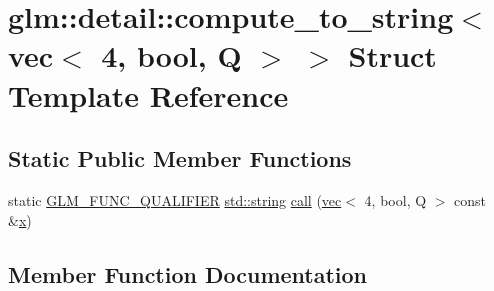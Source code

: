 \hypertarget{structglm_1_1detail_1_1compute__to__string_3_01vec_3_014_00_01bool_00_01_q_01_4_01_4}{}\section{glm\+:\+:detail\+:\+:compute\+\_\+to\+\_\+string$<$ vec$<$ 4, bool, Q $>$ $>$ Struct Template Reference}
\label{structglm_1_1detail_1_1compute__to__string_3_01vec_3_014_00_01bool_00_01_q_01_4_01_4}
\subsection*{Static Public Member Functions}
\begin{DoxyCompactItemize}
\item 
static \mbox{\hyperlink{setup_8hpp_a33fdea6f91c5f834105f7415e2a64407}{G\+L\+M\+\_\+\+F\+U\+N\+C\+\_\+\+Q\+U\+A\+L\+I\+F\+I\+ER}} \mbox{\hyperlink{_s_d_l__opengl__glext_8h_ae84541b4f3d8e1ea24ec0f466a8c568b}{std\+::string}} \mbox{\hyperlink{structglm_1_1detail_1_1compute__to__string_3_01vec_3_014_00_01bool_00_01_q_01_4_01_4_acc9ef66b31a0aaa989ee98614e340e27}{call}} (\mbox{\hyperlink{structglm_1_1vec}{vec}}$<$ 4, bool, Q $>$ const \&\mbox{\hyperlink{_s_d_l__opengl_8h_ad0e63d0edcdbd3d79554076bf309fd47}{x}})
\end{DoxyCompactItemize}


\subsection{Member Function Documentation}
\mbox{\label{structglm_1_1detail_1_1compute__to__string_3_01vec_3_014_00_01bool_00_01_q_01_4_01_4_acc9ef66b31a0aaa989ee98614e340e27}} 
